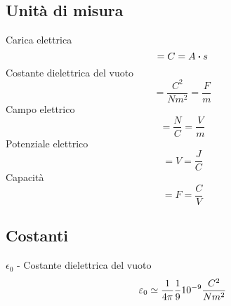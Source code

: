 \subsection{Unità di misura}
Carica elettrica
    \begin{equation} [Q] = C = A \vdot s \label{}\end{equation}
Costante dielettrica del vuoto
    \begin{equation} [\epsilon_0] = \frac{C^2}{Nm^2} = \frac{F}{m} \label{}\end{equation}
Campo elettrico
    \begin{equation} [E] = \frac{N}{C} = \frac{V}{m} \label{}\end{equation}
Potenziale elettrico
    \begin{equation} [V] = V = \frac{J}{C} \label{}\end{equation}
Capacità
    \begin{equation} [C] = F = \frac{C}{V} \label{}\end{equation}

\subsection{Costanti}
$\epsilon_0$ - Costante dielettrica del vuoto
    \begin{equation} \varepsilon_0 \simeq \frac{1}{4\pi} \frac{1}{9} 10^{-9} \frac{C^2}{Nm^2} \label{}\end{equation}
